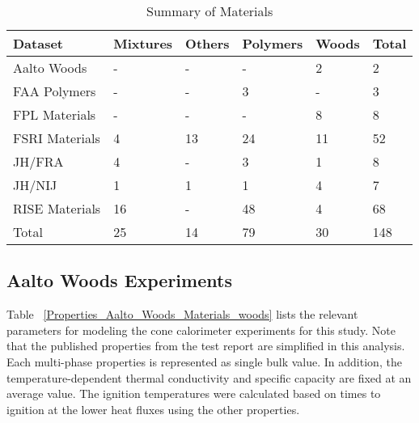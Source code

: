 \begin{table}[!h]
\caption[Summary of Materials]{Summary of Materials}
\centering
\begin{tabular}{|l|p{1.6cm}|p{1.6cm}|p{1.6cm}|p{1.6cm}|p{1.6cm}|}
\hline
Dataset & Mixtures & Others & Polymers & Woods & Total \\ \hline
Aalto Woods    & - & - & - & 2 & 2 \\ \hline
FAA Polymers   & - & - & 3 & - & 3 \\ \hline
FPL Materials  & - & - & - & 8 & 8 \\ \hline
FSRI Materials & 4 & 13 & 24 & 11 & 52 \\ \hline
JH/FRA         & 4 & - & 3 & 1 & 8 \\ \hline
JH/NIJ         & 1 & 1 & 1 & 4 & 7 \\ \hline
RISE Materials & 16 & - & 48 & 4 & 68 \\ \hline
Total & 25 & 14 & 79 & 30 & 148 \\ \hline
\end{tabular}
\label{Scaling_Pyrolysis_Materials}
\end{table}

\clearpage

\subsection{Aalto Woods Experiments}\label{sec_Aalto_Woods_Materials}

Table ~\ref{Properties_Aalto_Woods_Materials_woods} lists the relevant parameters for modeling the cone calorimeter experiments for this study.
Note that the published properties from the test report are simplified in this analysis. Each multi-phase properties is represented as single bulk value. 
In addition, the temperature-dependent thermal conductivity and specific capacity are fixed at an average value. 
The ignition temperatures were calculated based on times to ignition at the lower heat fluxes using the other properties.


